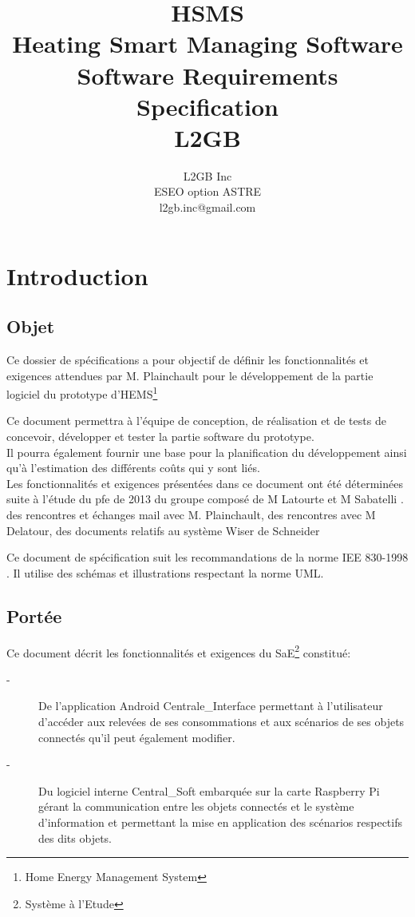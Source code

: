 \documentclass[10pt,a4paper]{report}
\author{L2GB Inc\\
		ESEO option ASTRE\\
		l2gb.inc@gmail.com
		}
\title{HSMS\\Heating Smart Managing Software  \\Software Requirements Specification\\L2GB}
\newcommand{\sommaire}{\shorttoc{Sommaire}{1}}
\begin{document}
\renewcommand{\figurename}{Illustration} 

\maketitle

\sommaire

	\chapter{Introduction}
		\section{Objet}
		
Ce dossier de spécifications a pour objectif de définir les fonctionnalités et exigences attendues par M. Plainchault pour le développement de la partie logiciel du prototype d'HEMS\footnote{Home Energy Management System} %

Ce document permettra à l'équipe de conception, de réalisation et de tests de concevoir, développer et tester la partie software du prototype.\\

Il pourra également fournir une base pour la planification du développement ainsi qu'à l'estimation des différents coûts qui y sont liés.\\

Les fonctionnalités et exigences présentées dans ce document ont été déterminées suite à l'étude du pfe de 2013 du groupe composé de M Latourte et M Sabatelli \cite{lastPfePoster}.%
des rencontres et échanges mail avec M. Plainchault, %
des rencontres avec M Delatour, 
des documents relatifs au système Wiser de Schneider  %

Ce document de spécification suit les recommandations de la norme IEE 830-1998 \cite{IEEE_830}. 
Il utilise des schémas et illustrations respectant la norme UML.

		\section{Portée}
		
Ce document décrit les fonctionnalités et exigences du SaE\footnote{Système à l'Etude} constitué:
\begin{description}
	\item[-] De l'application Android Centrale\_Interface permettant à l'utilisateur d'accéder aux relevées de ses consommations et aux scénarios de ses objets connectés qu'il peut également modifier. 
	\item[-] Du logiciel interne Central\_Soft embarquée sur la carte Raspberry Pi gérant la communication entre les objets connectés et le système d'information et permettant la mise en application des scénarios respectifs des dits objets.
\end{description}
\end{document}
